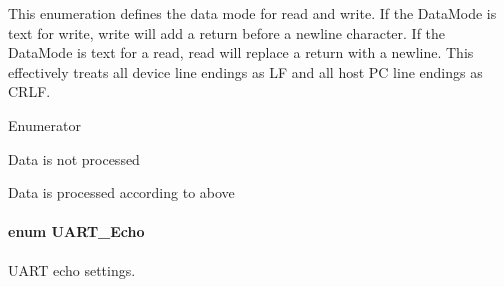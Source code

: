 This enumeration defines the data mode for read and write. If the Data\+Mode is text for write, write will add a return before a newline character. If the Data\+Mode is text for a read, read will replace a return with a newline. This effectively treats all device line endings as L\+F and all host P\+C line endings as C\+R\+L\+F. \begin{Desc}
\item[Enumerator]\par
\begin{description}
\item[{\em 
U\+A\+R\+T\+\_\+\+D\+A\+T\+A\+\_\+\+B\+I\+N\+A\+R\+Y\label{_u_a_r_t_8h_a694090fdb166f94ac30b809f9cba87b8aaa8edcbf6c236b0d86491ea1e7c9e4d8}
}]Data is not processed \item[{\em 
U\+A\+R\+T\+\_\+\+D\+A\+T\+A\+\_\+\+T\+E\+X\+T\label{_u_a_r_t_8h_a694090fdb166f94ac30b809f9cba87b8a87fdfb7ca981eab7f56c51380fd7094e}
}]Data is processed according to above \end{description}
\end{Desc}
\paragraph[{U\+A\+R\+T\+\_\+\+Echo}]{\setlength{\rightskip}{0pt plus 5cm}enum {\bf U\+A\+R\+T\+\_\+\+Echo}}\label{_u_a_r_t_8h_aac6a03c2e1d76f53e1d9d923dcdc24f2}


U\+A\+R\+T echo settings. 


